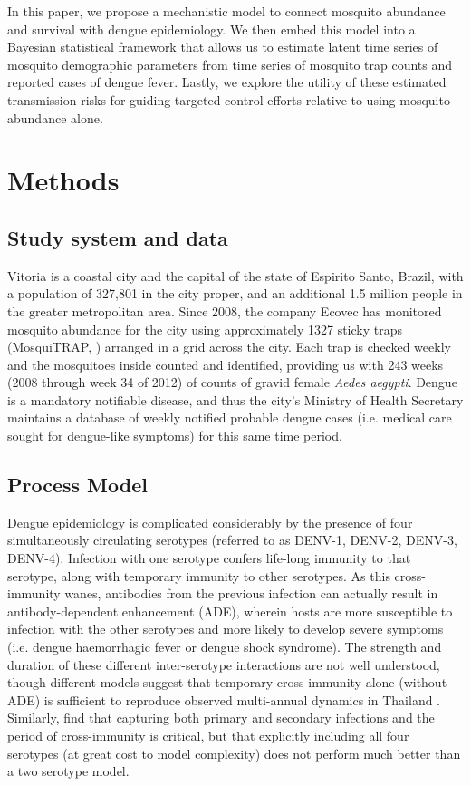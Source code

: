 \documentclass[10pt,letterpaper]{article}
\begin{document}
In this paper, we propose a mechanistic model to connect mosquito abundance and survival with dengue epidemiology.
We then embed this model into a Bayesian statistical framework that allows us to estimate latent time series of mosquito demographic parameters from time series of mosquito trap counts and reported cases of dengue fever.
Lastly, we explore the utility of these estimated transmission risks for guiding targeted control efforts relative to using mosquito abundance alone.

\section*{Methods}

\subsection*{Study system and data}

Vitoria is a coastal city and the capital of the state of Espirito Santo, Brazil, with a population of 327,801 in the city proper, and an additional 1.5 million people in the greater metropolitan area.  
Since 2008, the company Ecovec has monitored mosquito abundance for the city using approximately 1327 sticky traps (MosquiTRAP, \cite{Eiras2009}) arranged in a grid across the city.
Each trap is checked weekly and the mosquitoes inside counted and identified, providing us with 243 weeks (2008 through week 34 of 2012) of counts of gravid female \emph{Aedes aegypti}.
Dengue is a mandatory notifiable disease, and thus the city's Ministry of Health Secretary maintains a database of weekly notified probable dengue cases (i.e. medical care sought for dengue-like symptoms) for this same time period.

\subsection*{Process Model}

Dengue epidemiology is complicated considerably by the presence of four simultaneously circulating serotypes (referred to as DENV-1, DENV-2, DENV-3, DENV-4).
Infection with one serotype confers life-long immunity to that serotype, along with temporary immunity to other serotypes.  
As this cross-immunity wanes, antibodies from the previous infection can actually result in antibody-dependent enhancement (ADE), wherein hosts are more susceptible to infection with the other serotypes and more likely to develop severe symptoms (i.e. dengue haemorrhagic fever or dengue shock syndrome).
The strength and duration of these different inter-serotype interactions are not well understood, though different models suggest that temporary cross-immunity alone (without ADE) is sufficient to reproduce observed multi-annual dynamics in Thailand \cite{Wearing2006,Reich2013}.
Similarly, \cite{Aguiar2013} find that capturing both primary and secondary infections and the period of cross-immunity is critical, but that explicitly including all four serotypes (at great cost to model complexity) does not perform much better than a two serotype model.
\end{document}

